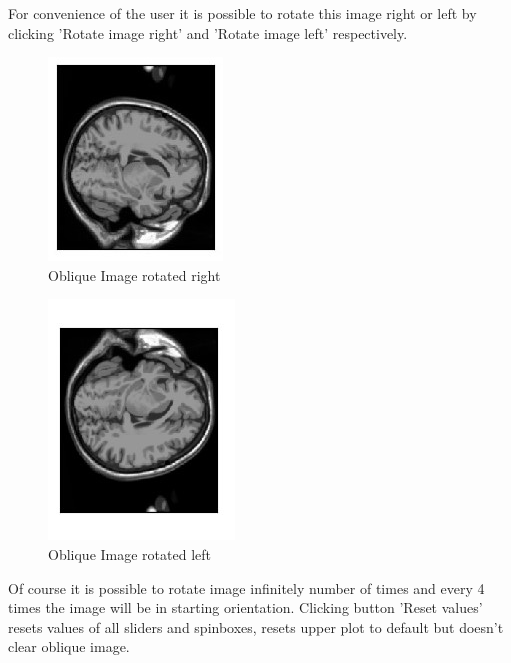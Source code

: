 \indent For convenience of the user it is possible to rotate this image right or left by clicking 'Rotate image right' and 'Rotate image left' respectively. 

\begin{figure}[H]
\centering{}\includegraphics[scale=0.7]{figures/module_12/mod1245oblr}\caption{Oblique Image rotated right\label{fig:figures/module_12/Preprocessing}}
\end{figure}

\begin{figure}[H]
\centering{}\includegraphics[scale=0.7]{figures/module_12/mod1245obll}\caption{Oblique Image rotated left\label{fig:figures/module_12/Preprocessing}}
\end{figure}

\indent Of course it is possible to rotate image infinitely number of times and every 4 times the image will be in starting orientation.
\newline\indent Clicking button 'Reset values' resets values of all sliders and spinboxes, resets upper plot to default but doesn't clear oblique image.

